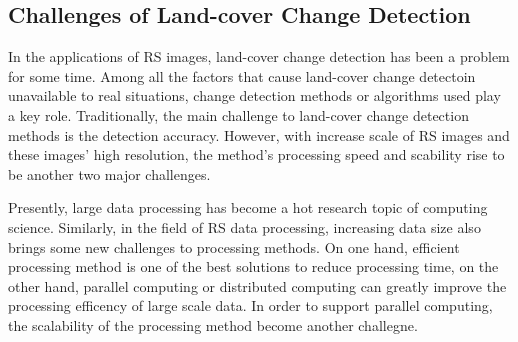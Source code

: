 \documentclass{elsart}
\begin{document}
\subsection{Challenges of Land-cover Change Detection}
In the applications of RS images, land-cover change detection has been a problem for some time.
Among all the factors that cause land-cover change detectoin unavailable to real situations, change detection methods or algorithms used play a key role.
Traditionally, the main challenge to land-cover change detection methods is the detection accuracy.
However, with increase scale of RS images and these images' high resolution, the method's processing speed and scability rise to be another two major challenges. 
\par 
Presently, large data processing has become a hot research topic of computing science. Similarly, in the field of RS data processing, increasing data size also brings some new challenges to processing methods. On one hand, efficient processing method is one of the best solutions to reduce processing time, on the other hand, parallel computing or distributed computing can greatly improve the processing efficency of large scale data. In order to support parallel computing, the scalability of the processing method become another challegne.
\end{document}
